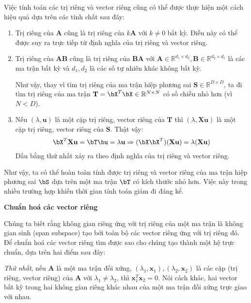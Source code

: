 	 Việc tính toán các trị riêng và vector riêng cũng có thể được thực hiện một cách hiệu quả dựa trên các tính chất sau đây:
	 \begin{enumerate}
	 	\item  Trị riêng của $\mathbf{A}$ cũng là trị riêng của $k\mathbf{A}$ với $k \neq 0$ bất kỳ. Điều này có thể được suy ra trực tiếp từ định nghĩa của trị riêng và vector riêng.
	 	
	 	
	 	\item Trị riêng của $\mathbf{AB}$ cũng là trị riêng của
	 	$\mathbf{BA}$ với $\mathbf{A} \in \mathbb{R}^{d_1 \times d_2}, \mathbf{B} \in \mathbb{R} ^{d_2 \times d_1}$ là các ma trận bất kỳ và $d_1, d_2$ là các số tự nhiên khác không bất kỳ.
	 	
	 	Như vậy, thay vì tìm trị riêng của ma trận hiệp phương sai $\mathbf{S} \in \mathbb{R}^{D\times D}$, ta đi tìm trị riêng của ma trận $\mathbf{T} = \bX^T \bX \in \mathbb{R}^{N \times N}$ có số chiều nhỏ hơn (vì $N < D$).
	 	
	 	\item Nếu $(\lambda, \mathbf{u})$ là một cặp trị riêng,
	 	vector riêng của $\mathbf{T}$ thì $(\lambda, \mathbf{Xu})$ là một cặp trị
	 	riêng, vector riêng của $\mathbf{S}$. Thật vậy:
	 	\begin{eqnarray}
	 	\label{eqn:28_8}
	 	\bX^T \mathbf{Xu} = \bT\bu = \lambda \mathbf{u}
	 	\Rightarrow (\bX\bX^T)(\mathbf{Xu}) = \lambda (\mathbf{Xu} )
	 	\end{eqnarray}
	 	Dấu bằng thứ nhất xảy ra theo định nghĩa của trị riêng và vector riêng.
	 \end{enumerate}
	 
	 Như vậy, ta có thể hoàn toàn tính được trị riêng và vector riêng của ma trận
	 hiệp phương sai $\bS$ dựa trên một ma trận $\bT$ có kích thước nhỏ hơn. Việc
	 này trong nhiều trường hợp khiến thời gian tính toán giảm đi đáng kể.
	 
\textbf{Chuẩn hoá các vector riêng}
	 
Chúng ta biết rằng không gian riêng ứng với trị riêng của một ma trận là không gian sinh (span subspace) tạo bởi toàn bộ các vector riêng ứng với trị riêng đó. Để chuẩn hoá các vector riêng tìm được sao cho chúng tạo thành một hệ trực chuẩn, dựa trên hai điểm sau đây:
	 
	  \textit{Thứ nhất}, nếu $\mathbf{A}$ là một ma trận đối xứng, $(\lambda_1,  \mathbf{x}_1), (\lambda_2, \mathbf{x}_2)$ là các cặp (trị riêng, vector riêng) của $\mathbf{A}$ với $\lambda_1 \neq \lambda_2$, thì  $\mathbf{x}_1^T\mathbf{x}_2 = 0$. Nói cách khác, hai vector bất kỳ trong hai không gian riêng khác nhau của một ma trận đối xứng trực giao với nhau.
	
